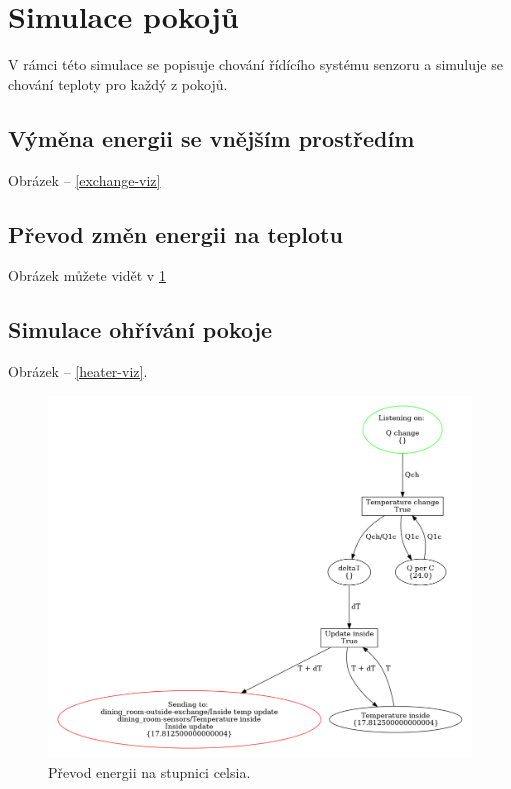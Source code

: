 \section{Simulace pokojů}
\label{sec:room-sim-details}

V rámci této simulace se popisuje chování řídícího systému senzoru a simuluje se chování teploty pro každý z pokojů.

\subsection{Výměna energii se vnějším prostředím}

Obrázek -- \ref{exchange-viz}

\subsection{Převod změn energii na teplotu}

Obrázek můžete vidět v \ref{room-temp-viz}

\subsection{Simulace ohřívání pokoje}

Obrázek -- \ref{heater-viz}.

\begin{figure}[htb]
 \centering
 \includegraphics[width=\textwidth]{obrazky-figures/room-temp-upd.png}
 \caption{Převod energii na stupnici celsia.}
 \label{room-temp-viz}
\end{figure}


